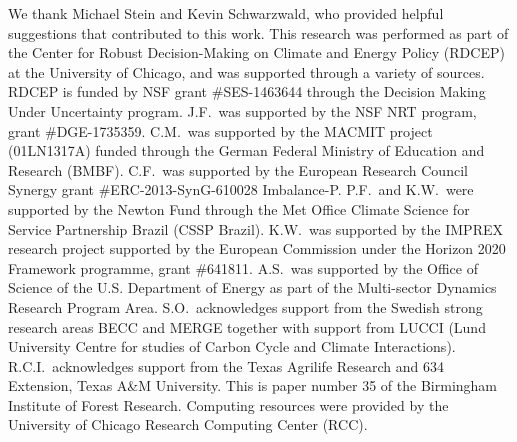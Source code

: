 \documentclass[gmd, manuscript]{copernicus} %
\begin{document}
\noappendix %



\begin{acknowledgements}
We thank Michael Stein and Kevin Schwarzwald, who provided helpful suggestions that contributed to this work. This research was performed as part of the Center for Robust Decision-Making on Climate and Energy Policy (RDCEP) at the University of Chicago, and was supported through a variety of sources. RDCEP is funded by NSF grant \#SES-1463644 through the Decision Making Under Uncertainty program. J.F.\ was supported by the NSF NRT program, grant \#DGE-1735359. C.M.\ was supported by the MACMIT project (01LN1317A) funded through the German Federal Ministry of Education and Research (BMBF). C.F.\ was supported by the European Research Council Synergy grant \#ERC-2013-SynG-610028 Imbalance-P. P.F.\ and K.W.\ were supported  by the Newton Fund through the Met Office Climate Science for Service Partnership Brazil (CSSP Brazil). K.W.\ was supported by the IMPREX research project supported by the European Commission under the Horizon 2020 Framework programme, grant \#641811. A.S.\ was supported by the Office of Science of the U.S. Department of Energy as part of the Multi-sector Dynamics Research Program Area. S.O.\ acknowledges support from the Swedish strong research areas BECC and MERGE together with support from LUCCI (Lund University Centre for studies of Carbon Cycle and Climate Interactions). R.C.I.\ acknowledges support from the Texas Agrilife Research and 634 Extension, Texas A&M University. This is paper number 35 of the Birmingham Institute of Forest Research. Computing resources were provided by the University of Chicago Research Computing Center (RCC).
\end{acknowledgements}



\end{document}
